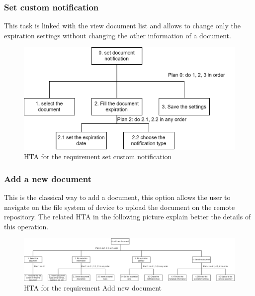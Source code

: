 \subsubsection{Set custom notification}
This task is linked with the view document list and allows to change only the expiration settings without changing the other information of a document. 
\begin{figure}[H]
	\centering
	\includegraphics[width=\textwidth]{../Draw.io diagrams/set_notification.drawio.png}  %
	\caption{HTA for the requirement set custom notification}
\end{figure}
\subsubsection{Add a new document}
This is the classical way to add a document, this option allows the user to navigate on the file system of device to upload the document on the remote repository.
The related HTA in the following picture explain better the details of this operation.
\begin{figure}[H]
	\centering
	\includegraphics[width=\textwidth]{../Draw.io diagrams/add_new_document.drawio.png}  %
	\caption{HTA for the requirement Add new document}
\end{figure}
